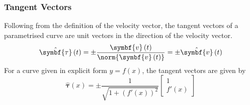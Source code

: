 \documentclass{article}
\begin{document}
\subsubsection{Tangent Vectors}
Following from the definition of the velocity vector, the tangent
vectors of a parametrised curve are unit vectors in the direction of
the velocity vector.
\begin{equation*}
    \hat{\symbf{\tau}}\left( t \right) = \pm \frac{\symbf{v}\left( t \right)}{\norm{\symbf{v}\left( t \right)}} = \pm \hat{\symbf{v}}\left( t \right)
\end{equation*}
For a curve given in explicit form \(y = f\left( x \right)\), the tangent vectors are given by
\begin{equation*}
    \hat{\symbf{\tau}}\left( x \right) = \pm \frac{1}{\sqrt{1 + \left( f'\left( x \right) \right)^2}}
    \begin{bmatrix}
        1 \\
        f'\left( x \right)
    \end{bmatrix}
\end{equation*}
\end{document}
